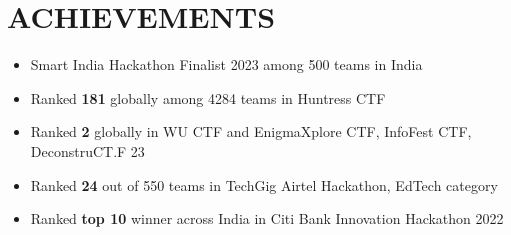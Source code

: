 \documentclass[letterpaper,11pt]{article}
\makeatletter
\newcommand{\resumeItem}[1]{
  \item\small{
    {#1 \vspace{-1pt}}
  }
}
\newcommand{\resumeSubheading}[4]{
  \vspace{-1pt}\item
    \begin{tabular*}{\textwidth}[t]{l@{\extracolsep{\fill}}r}
      \textbf{#1} & {\color{dark-grey}\small #2}\vspace{1pt}\\ %
      \textit{#3} & {\color{dark-grey} \small #4}\\ %
    \end{tabular*}\vspace{-4pt}
}
\newcommand{\resumeSubHeadingListStart}{\begin{itemize}[leftmargin=0in, label={}]}
\newcommand{\resumeSubHeadingListEnd}{\end{itemize}}
\newcommand{\resumeItemListStart}{\begin{itemize}}
\newcommand{\resumeItemListEnd}{\end{itemize}\vspace{0pt}}
\makeatother
\begin{document}
\section{ACHIEVEMENTS}
        \resumeItemListStart [noitemsep] %
            \resumeItem{Smart India Hackathon Finalist 2023 among 500 teams in India }
            \resumeItem{Ranked \textbf{181} globally among 4284 teams in Huntress CTF}
            \resumeItem{Ranked \textbf{2} globally in WU CTF and EnigmaXplore CTF, InfoFest CTF, DeconstruCT.F 23}
            \resumeItem{Ranked \textbf{24} out of 550 teams in TechGig Airtel Hackathon, EdTech category}
            \resumeItem{Ranked \textbf{top 10} winner across India in Citi Bank Innovation Hackathon 2022}
        \resumeItemListEnd

\begin{comment}
    \resumeSubheading
      {Google Verily}{Aug. 2018 -- Sept. 2019}
      {Software Engineer}{San Francisco, CA}
      \resumeItemListStart
        \resumeItem{\textbf{Led front-end development} of a dashboard to process 50k blood samples and detect early-stage cancer}
        \resumeItem{Rebuilt a Quality Control product with input from 20 cross-functional stakeholders, \textbf{saving \$1M annually}}
        \resumeItem{Spearheaded product development of a new lab workflow tool, leading to a 40\% increase in efficiency; \\ shadowed 10 core users, iterated on design docs, and implemented the solution with one engineer}

    \resumeItemListEnd

    \resumeSubheading
      {Amazon}{May 2017 -- Aug. 2017}
      {Software Engineering Intern}{Seattle, WA}
      \resumeItemListStart
        \resumeItem{Worked on the Search Customer Experience Team; \textbf{received a return offer} for a full-time position}
        \resumeItem{\textbf{Shipped a new feature to 2M+ users} to improve the search experience for movie series-related queries}
        \resumeItem{Built a back-end database service in Java and implemented a front-end UI to support future changes}
      \resumeItemListEnd

  \resumeSubHeadingListEnd
\end{comment}

\end{document}
